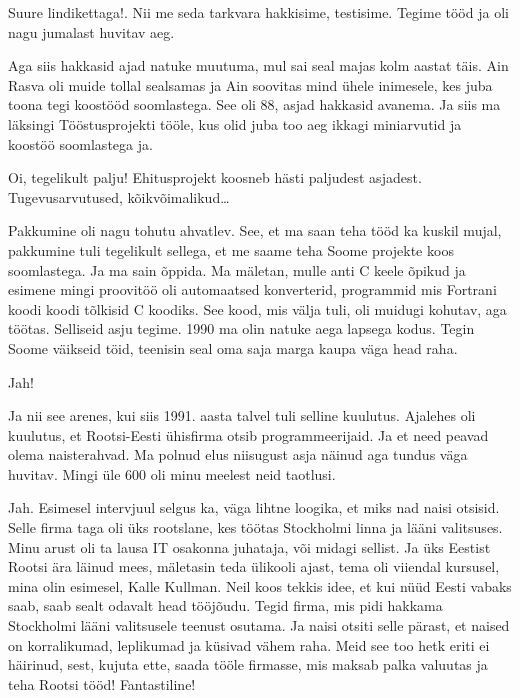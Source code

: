 
Suure lindikettaga!. Nii me seda tarkvara hakkisime, testisime. Tegime tööd ja oli nagu jumalast huvitav aeg.

Aga siis hakkasid ajad natuke muutuma, mul sai seal majas kolm aastat täis. Ain Rasva oli muide tollal sealsamas ja Ain soovitas mind ühele inimesele, kes juba toona tegi koostööd soomlastega. See oli 88, asjad hakkasid avanema. Ja siis ma läksingi Tööstusprojekti tööle, kus  olid juba too aeg ikkagi miniarvutid ja koostöö soomlastega ja. 


Oi, tegelikult palju! Ehitusprojekt koosneb  hästi paljudest asjadest. Tugevusarvutused, kõikvõimalikud\ldots 


Pakkumine oli nagu tohutu ahvatlev. See, et ma saan teha tööd ka kuskil mujal, pakkumine tuli tegelikult sellega, et me saame teha Soome projekte koos soomlastega. Ja ma sain õppida. Ma mäletan, mulle anti C keele õpikud ja esimene mingi proovitöö oli automaatsed konverterid,  programmid mis  Fortrani koodi koodi tõlkisid C koodiks. See kood, mis välja tuli, oli muidugi kohutav, aga töötas. Selliseid asju tegime. 1990 ma olin natuke aega lapsega kodus. Tegin Soome väikseid töid, teenisin seal oma saja marga kaupa  väga head raha. 


Jah!

Ja nii see arenes, kui siis 1991. aasta talvel tuli selline kuulutus. Ajalehes oli kuulutus, et Rootsi-Eesti ühisfirma otsib programmeerijaid. Ja et need peavad olema naisterahvad. Ma polnud elus niisugust asja näinud aga tundus väga huvitav. Mingi üle 600 oli minu meelest neid taotlusi. 


Jah. Esimesel intervjuul selgus ka, väga lihtne loogika, et miks nad naisi otsisid. Selle firma taga oli üks rootslane, kes töötas Stockholmi linna ja lääni valitsuses. Minu arust oli ta lausa IT osakonna juhataja, või midagi sellist. Ja  üks Eestist Rootsi ära läinud mees, mäletasin teda ülikooli ajast, tema oli viiendal kursusel, mina olin esimesel, Kalle Kullman. Neil koos tekkis idee, et kui nüüd Eesti vabaks saab, saab sealt odavalt head tööjõudu. Tegid firma, mis pidi hakkama Stockholmi lääni valitsusele teenust osutama. Ja naisi otsiti selle pärast, et naised on korralikumad, leplikumad ja küsivad vähem raha. Meid see too hetk eriti ei häirinud, sest, kujuta ette, saada tööle firmasse, mis maksab palka valuutas ja teha Rootsi tööd! Fantastiline!


